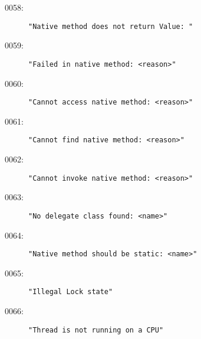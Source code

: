\begin{description}
\item[0058:] \texttt{"Native method does not return Value:\ "}
\item[0059:] \texttt{"Failed in native method:\ <reason>"}
\item[0060:] \texttt{"Cannot access native method:\ <reason>"}
\item[0061:] \texttt{"Cannot find native method:\ <reason>"}
\item[0062:] \texttt{"Cannot invoke native method:\ <reason>"}
\item[0063:] \texttt{"No delegate class found:\ <name>"}
\item[0064:] \texttt{"Native method should be static:\ <name>"}
\item[0065:] \texttt{"Illegal Lock state"}
\item[0066:] \texttt{"Thread is not running on a CPU"}
\end{description}
